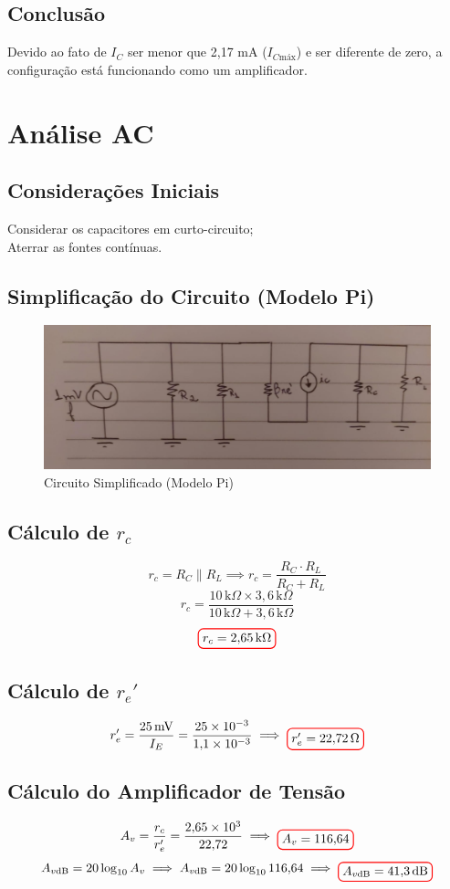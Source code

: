 \documentclass[12pt,openany,oneside,a4paper]{abntex2}
\begin{document}
\section{Conclusão}
Devido ao fato de $I_{C}$ ser menor que 2{,}17 mA ($I_{C\text{máx}}$) e ser diferente de zero, a configuração está funcionando como um amplificador.

\chapter{Análise AC}
\section{Considerações Iniciais}
Considerar os capacitores em curto-circuito; \\
Aterrar as fontes contínuas.

\section{Simplificação do Circuito (Modelo Pi)}
\begin{figure}[h]
  \centering
  \includegraphics[width=\linewidth]{f3.jpeg}
  \caption{Circuito Simplificado (Modelo Pi)}
  \label{fig:exemplo}
\end{figure}

\section{Cálculo de $r_c$}
\[
r_c = {R_C \parallel R_L} \implies r_c = \frac{R_C \cdot R_L}{R_C + R_L}
\]
\[
r_c = \frac{10 \, \text{k}\Omega \times 3{,}6 \, \text{k}\Omega}{10 \, \text{k}\Omega + 3{,}6 \, \text{k}\Omega}
\]
\[
\tikz[baseline]{\node[draw=red, thick, rounded corners] {$r_c = 2{,}65 \, \text{k}\Omega$};}
\]

\section{Cálculo de $r_e'$}
\[
r_e^{\prime} = \frac{25 \, \text{mV}}{I_E} = \frac{25 \times 10^{-3}}{1{,}1 \times 10^{-3}} \implies \tikz[baseline]{\node[draw=red, thick, rounded corners] {$r_e^{\prime} = 22{,}72 \, \Omega$};}
\]

\section{Cálculo do Amplificador de Tensão}
\[
A_v = \frac{r_c}{r_e'} = \frac{2{,}65 \times 10^3}{22{,}72} \implies \tikz[baseline]{\node[draw=red, thick, rounded corners] {$A_v = 116{,}64$};}
\]
\[
A_{v\text{dB}} = 20 \log_{10} A_v \implies A_{v\text{dB}} = 20 \log_{10} 116{,}64 \implies \tikz[baseline]{\node[draw=red, thick, rounded corners] {$A_{v\text{dB}} = 41{,}3 \, \text{dB}$};}
\]
\end{document}
